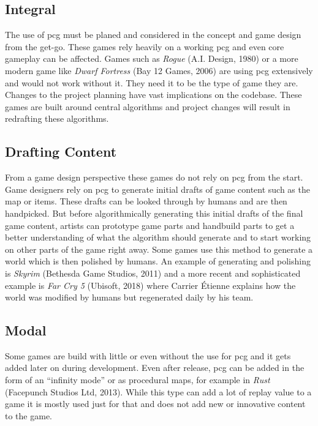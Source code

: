 \documentclass[10pt,a4paper]{article}
\begin{document}
\subsection{Integral}
\begin{multicols}{2} The use of \gls{pcg} must be planed and considered in the concept and game design from the get-go. These games rely heavily on a working \gls{pcg} and even core gameplay can be affected. Games such as \textit{Rogue} (A.I. Design, 1980) or a more modern game like \textit{Dwarf Fortress} (Bay 12 Games, 2006) are using \gls{pcg} extensively and would not work without it. They need it to be the type of game they are. Changes to the project planning have vast implications on the codebase. These games are built around central algorithms and project changes will result in redrafting these algorithms.
\end{multicols}
\subsection{Drafting Content}
\begin{multicols}{2} From a game design perspective these games do not rely on \gls{pcg} from the start. Game designers rely on \gls{pcg} to generate initial drafts of game content such as the map or items. These drafts can be looked through by humans and are then handpicked. But before algorithmically generating this initial drafts of the final game content, artists can prototype game parts and handbuild parts to get a better understanding of what the algorithm should generate and to start working on other parts of the game right away. Some games use this method to generate a world which is then polished by humans. An example of generating and polishing is \textit{Skyrim} (Bethesda Game Studios, 2011) and a more recent and sophisticated example is \textit{Far Cry 5} (Ubisoft, 2018) where Carrier Étienne explains how the world was modified by humans but regenerated daily by his team\cite{Carrier2018}.
\end{multicols}
\subsection{Modal}
\begin{multicols}{2} Some games are build with little or even without the use for \gls{pcg} and it gets added later on during development. Even after release, \gls{pcg} can be added in the form of an “infinity mode” or as procedural maps, for example in \textit{Rust} (Facepunch Studios Ltd, 2013). While this type can add a lot of replay value to a game it is mostly used just for that and does not add new or innovative content to the game.
\end{multicols}
\end{document}

